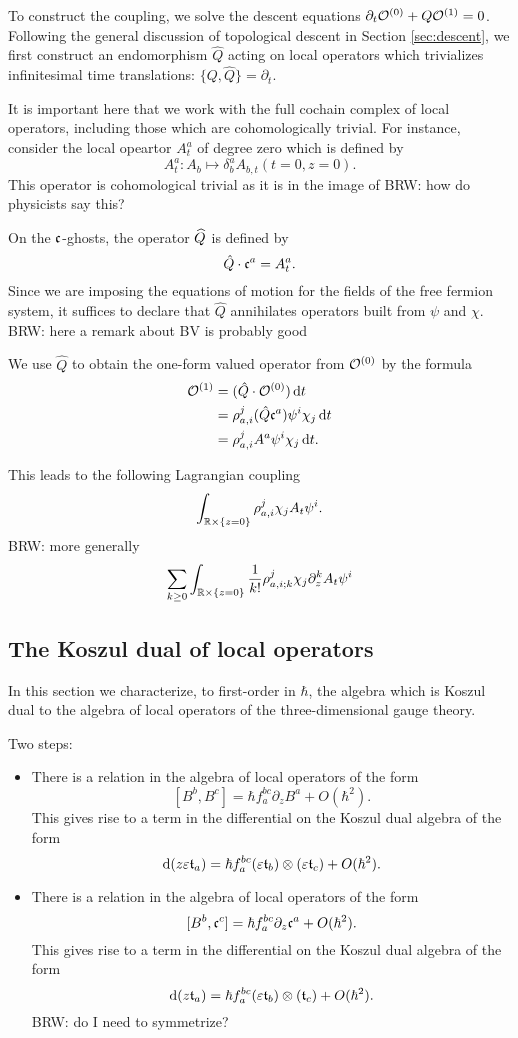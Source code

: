 \documentclass[11pt]{amsart}
\def\ep{\varepsilon}
\def\brian#1{{\textcolor{blue!65!red}{BRW: {#1}}}}
\begin{document}
To construct the coupling, we solve the descent equations $\partial_t \cO^{(0)} + Q \cO^{(1)} = 0$.
Following the general discussion of topological descent in Section \ref{sec:descent}, we first construct an endomorphism $\hat{Q}$ acting on local operators which trivializes infinitesimal time translations: $\{Q, \hat{Q}\} = \partial_t$. 

It is important here that we work with the full cochain complex of local operators, including those which are cohomologically trivial. 
For instance, consider the local opeartor $A^a_t$ of degree zero which is defined by
\[
A^a_{t} \colon A_b \mapsto \delta^a_b A_{b,t} (t=0, z=0) .
\]
This operator is cohomological trivial as it is in the image of \brian{how do physicists say this?}

On the $\fc$-ghosts, the operator $\Hat{Q}$ is defined by 
\[
\hat{Q} \cdot \fc^a = A^a_t  .
\]
Since we are imposing the equations of motion for the fields of the free fermion system, it suffices to declare that $\hat{Q}$ annihilates operators built from $\psi$ and $\chi$. 
\brian{here a remark about BV is probably good}

We use $\hat{Q}$ to obtain the one-form valued operator from $\cO^{(0)}$ by the formula
\begin{align*}
\cO^{(1)} & = (\hat{Q} \cdot \cO^{(0)}) \, \d t \\
& = \rho_{a,i}^j (\hat{Q} \fc^a) \psi^i \chi_j \, \d t \\ 
& = \rho_{a,i}^j A^a \psi^i \chi_j \, \d t .
\end{align*}

This leads to the following Lagrangian coupling
\[
\int_{\RR \times \{z=0\}} \rho_{a,i}^j \chi_j  A_t \psi^i  .
\]
\brian{more generally
\[
\sum_{k \geq 0} \int_{\RR \times \{z=0\}} \frac{1}{k!} \rho_{a,i;k}^j \chi_j \partial_z^k A_t \psi^i
\]
}
\subsection*{The Koszul dual of local operators}

In this section we characterize, to first-order in $\hbar$, the algebra which is Koszul dual to the algebra of local operators of the three-dimensional gauge theory. 

Two steps:
\begin{itemize}
\item There is a relation in the algebra of local operators of the form
\[
[B^b, B^c] = \hbar f^{bc}_a \partial_z B^a + O(\hbar^2)  .
\]
This gives rise to a term in the differential on the Koszul dual algebra of the form
\[
\d (z \ep \ft_a) = \hbar  f^{bc}_a (\ep \ft_b) \otimes (\ep \ft_c) + O(\hbar^2) .
\]
\item There is a relation in the algebra of local operators of the form
\[
[B^b, \fc^c] = \hbar f^{bc}_a \partial_z \fc^a + O(\hbar^2) .
\]
This gives rise to a term in the differential on the Koszul dual algebra of the form
\[
\d (z \ft_a) = \hbar  f^{bc}_a (\ep \ft_b) \otimes (\ft_c) + O(\hbar^2) .
\]
\brian{do I need to symmetrize?}
\end{itemize}
\end{document}
